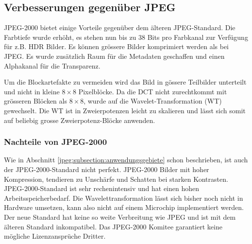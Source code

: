 \subsection{Verbesserungen gegenüber JPEG
\label{jpeg:subsection:verbesserungen}}
JPEG-2000 bietet einige Vorteile gegenüber dem älteren JPEG-Standard.
Die Farbtiefe wurde erhöht, es stehen nun bis zu 38 Bits pro Farbkanal zur Verfügung für z.B. HDR Bilder.
Es können grössere Bilder komprimiert werden als bei JPEG.
Es wurde zusätzlich Raum für die Metadaten geschaffen und einen Alphakanal für die Transparenz.
 
Um die Blockartefakte zu vermeiden wird das Bild in gössere Teilbilder unterteilt und nicht in kleine \(8\times8\) Pixelblöcke.
Da die DCT nicht zurechtkommt mit grösseren Blöcken als \(8\times8\), wurde auf die Wavelet-Transformation (WT) gewechselt.
Die WT ist in Zweierpotenzen leicht zu skalieren und lässt sich somit auf beliebig grosse Zweierpotenz-Blöcke anwenden.

\subsubsection{Nachteile von JPEG-2000
\label{jpeg:subsubsection:nachteil}}
Wie in Abschnitt \ref{jpeg:subsection:anwendungsgebiete} schon beschrieben, ist auch der JPEG-2000-Standard nicht perfekt.
JPEG-2000 Bilder mit hoher Kompression, tendieren zu Unschärfe und Schatten bei starken Kontrasten. 
JPEG-2000-Standard ist sehr rechenintensiv und hat einen hohen Arbeitsspeicherbedarf. 
Die Wavelettransformation lässt sich bisher noch nicht in Hardware umsetzen, kann also nicht auf einem Microchip implementiert werden.
Der neue Standard hat keine so weite Verbreitung wie JPEG und ist mit dem älteren Standard inkompatibel.
Das JPEG-2000 Komitee garantiert keine mögliche Lizenzansprüche Dritter.
